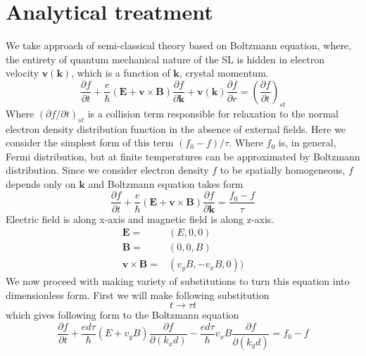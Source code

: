 \documentclass[40pt,letterpaper,physrev]{article}
\begin{document}
  \section{Analytical treatment}
    We take approach of semi-classical theory based on Boltzmann equation, where, the entirety of quantum 
    mechanical nature of the SL is hidden in electron velocity $\mathbf{v}(\mathbf{k})$, which is a function of $
    \mathbf{k}$, crystal momentum. 
    \begin{equation}\label{eq:boltzmann}
     \frac{\partial f}{\partial t}+
     \frac{e}{\hbar}\left ( \mathbf{E} + \mathbf{v}\times\mathbf{B} \right ) \frac{\partial f}{\partial\mathbf{k}}+
     \mathbf{v}(\mathbf{k})\frac{\partial f}{\partial r} = \left ( \frac{\partial f}{\partial t} \right )_{st}
    \end{equation}
    Where $\left ( \partial f/\partial t \right )_{st}$ is a collision term responsible for relaxation to the
    normal electron density distribution function in the absence of external fields. Here we consider the simplest
    form of this term $(f_0-f)/\tau$. Where $f_0$ is, in general, Fermi distribution, but at finite temperatures
    can be approximated by Boltzmann distribution.
    Since we consider electron density $f$ to be spatially homogeneous, $f$ depends only on $\mathbf{k}$ and 
    Boltzmann equation takes form
    \begin{equation}\label{eq:boltzmann_homo}
     \frac{\partial f}{\partial t}+
     \frac{e}{\hbar}\left ( \mathbf{E} + \mathbf{v}\times\mathbf{B} \right ) \frac{\partial f}{\partial\mathbf{k}}
     = \frac{f_0 - f}{\tau}
    \end{equation}
    Electric field is along x-axis and magnetic field is along z-axis.
    \begin{align}
     \mathbf{E}=&(E,0,0) \\
     \mathbf{B}=&(0,0,B) \\
     \mathbf{v}\times\mathbf{B}=&(v_y B, -v_x B, 0))
    \end{align}
    We now proceed with making variety of substitutions to turn this equation into dimensionless form. First we
    will make following substitution
    \begin{equation}
     t \to \tau t
    \end{equation}
    which gives following form to the Boltzmann equation
    \begin{equation}
     \frac{\partial f}{\partial t}+
     \frac{ed\tau}{\hbar}(E+v_{y}B)\frac{\partial f}{\partial(k_x d)}-
     \frac{ed\tau}{\hbar}v_{x}B\frac{\partial f}{\partial(k_y d)}
     = f_0 - f
    \end{equation}
\end{document}
